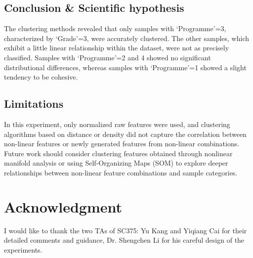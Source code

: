 \documentclass[journal]{IEEEtai}
\begin{document}
\subsection{\textbf{Conclusion \& Scientific hypothesis}}
The clustering methods revealed that only samples with `Programme'=3, characterized by `Grade'=3, were accurately clustered. The other samples, which exhibit a little linear relationship within the dataset, were not as precisely classified. Samples with `Programme'=2 and 4 showed no significant distributional differences, whereas samples with `Programme'=1 showed a slight tendency to be cohesive.
\subsection{\textbf{Limitations}}
In this experiment, only normalized raw features were used, and clustering algorithms based on distance or density did not capture the correlation between non-linear features or newly generated features from non-linear combinations. Future work should consider clustering features obtained through nonlinear manifold analysis or using Self-Organizing Maps (SOM) to explore deeper relationships between non-linear feature combinations and sample categories.

\section{\textbf{Acknowledgment}}
I would like to thank the two TAs of SC375: Yu Kang and Yiqiang Cai for their detailed comments and guidance, Dr. Shengchen Li for his careful design of the experiments.
\end{document}
